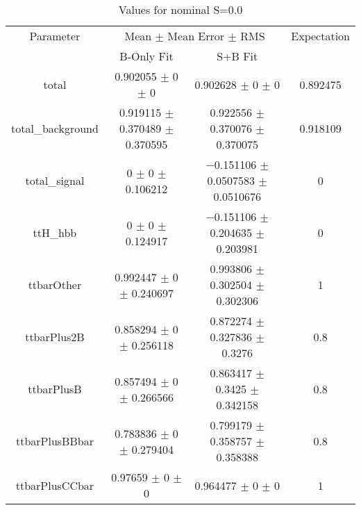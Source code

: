\begin{table}
\centering
\caption{Values for nominal S=0.0}
\begin{tabular}{cccc}
\toprule
Parameter & \multicolumn{2}{c}{Mean $\pm$ Mean Error $\pm$ RMS} & Expectation\\
 & B-Only Fit & S+B Fit & \\
\midrule
total & \num{0.902055} $\pm$ \num{0} $\pm$ \num{0} & \num{0.902628} $\pm$ \num{0} $\pm$ \num{0} & \num{0.892475}\\
total\_background & \num{0.919115} $\pm$ \num{0.370489} $\pm$ \num{0.370595} & \num{0.922556} $\pm$ \num{0.370076} $\pm$ \num{0.370075} & \num{0.918109}\\
total\_signal & \num{0} $\pm$ \num{0} $\pm$ \num{0.106212} & \num{-0.151106} $\pm$ \num{0.0507583} $\pm$ \num{0.0510676} & \num{0}\\
ttH\_hbb & \num{0} $\pm$ \num{0} $\pm$ \num{0.124917} & \num{-0.151106} $\pm$ \num{0.204635} $\pm$ \num{0.203981} & \num{0}\\
ttbarOther & \num{0.992447} $\pm$ \num{0} $\pm$ \num{0.240697} & \num{0.993806} $\pm$ \num{0.302504} $\pm$ \num{0.302306} & \num{1}\\
ttbarPlus2B & \num{0.858294} $\pm$ \num{0} $\pm$ \num{0.256118} & \num{0.872274} $\pm$ \num{0.327836} $\pm$ \num{0.3276} & \num{0.8}\\
ttbarPlusB & \num{0.857494} $\pm$ \num{0} $\pm$ \num{0.266566} & \num{0.863417} $\pm$ \num{0.3425} $\pm$ \num{0.342158} & \num{0.8}\\
ttbarPlusBBbar & \num{0.783836} $\pm$ \num{0} $\pm$ \num{0.279404} & \num{0.799179} $\pm$ \num{0.358757} $\pm$ \num{0.358388} & \num{0.8}\\
ttbarPlusCCbar & \num{0.97659} $\pm$ \num{0} $\pm$ \num{0} & \num{0.964477} $\pm$ \num{0} $\pm$ \num{0} & \num{1}\\
\bottomrule
\end{tabular}
\end{table}